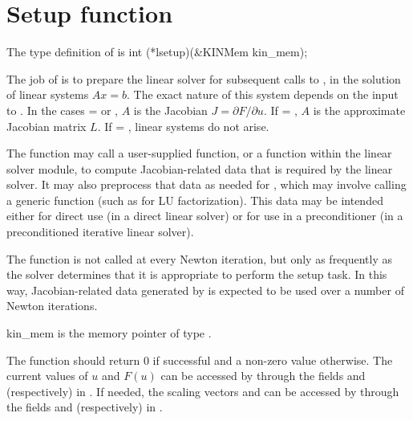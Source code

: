 
\section{Setup function} 
The type definition of  is
{
  int (*lsetup)(&KINMem kin\_mem);
}
{
  The job of  is to prepare the linear solver for subsequent 
  calls to , in the solution of linear systems $A x = b$.
  The exact nature of this system depends on the input  to
  .  In the cases  =  or
  , $A$ is the Jacobian $J = \partial F / \partial u$.
  If  = , $A$ is the approximate Jacobian matrix $L$.
  If  = , linear systems do not arise.

  The  function may call a user-supplied function, or a function
  within the linear solver module, to compute Jacobian-related data
  that is required by the linear solver.  It may also preprocess that
  data as needed for , which may involve calling a generic
  function (such as for LU factorization).  This data may be intended
  either for direct use (in a direct linear solver) or for use in a
  preconditioner (in a preconditioned iterative linear solver).

  The  function is not called at every Newton iteration, but only
  as frequently as the solver determines that it is appropriate to perform
  the setup task.  In this way, Jacobian-related data generated by 
  is expected to be used over a number of Newton iterations.
}
{
  \begin{args}
  \item[kin\_mem]
    is the {\kinsol} memory pointer of type .
  \end{args}
}
{
  The  function should return 0 if successful and
  a non-zero value otherwise.
}
{
  The current values of $u$ and $F(u)$ can be accessed by  through
  the fields  and  (respectively) in .
  If needed, the scaling vectors  and  can be
  accessed by  through the fields  and 
  (respectively) in .
}


